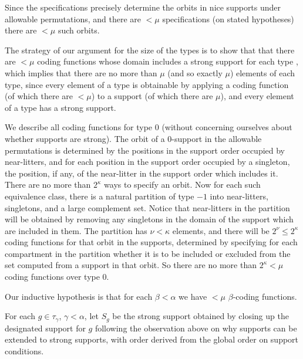 \documentclass[112pt]{article}
\begin{document}
Since the specifications precisely determine the orbits in nice supports under allowable permutations, and there are $<\mu$ specifications
(on stated hypotheses) there are $<\mu$ such orbits.

The strategy of our argument for the size of the types is to show that that there are $<\mu$ coding functions whose domain includes a strong support for each type , which implies that there are no more than $\mu$ (and so exactly $\mu$) elements of each type, since every element of a type is obtainable by applying a coding function (of which there are $<\mu$) to a support (of which there are $\mu$), and every element of a type has a strong support.

\begin{description}

\item[Analysis of coding functions for type 0:]  We describe all coding functions for type 0 (without concerning ourselves about whether supports are strong).  The orbit of a 0-support in the allowable permutations is determined by the positions in the support order occupied by near-litters, and for each position in the support order occupied by a singleton, the position, if any, of the near-litter in the support order which includes it.  There are no more than $2^\kappa$ ways to specify an orbit.  Now for each such equivalence class, there is a natural partition of type $-1$ into near-litters, singletons, and a large complement set.  Notice that near-litters in the partition will be obtained by removing any singletons in the domain of the support which are included in them.  The partition has $\nu<\kappa$ elements, and there will be $2^\nu\leq 2^\kappa$ coding functions for that orbit in the supports, determined by specifying for each compartment in the partition whether it is to be included or excluded from the set computed from a support in that orbit.  So there are no more than $2^\kappa<\mu$ coding functions over type 0.

\item[Analysis of the general case:]  

\item
Our inductive hypothesis is that for each $\beta<\alpha$ we have $<\mu$ $\beta$-coding functions.

For each $g \in \tau_\gamma$, $\gamma<\alpha$, let $S_g$ be the strong support obtained by closing up the designated support for $g$ following the observation above on why supports can be extended to strong supports, with order derived from the global order on support conditions.


\end{description}
\end{document}
